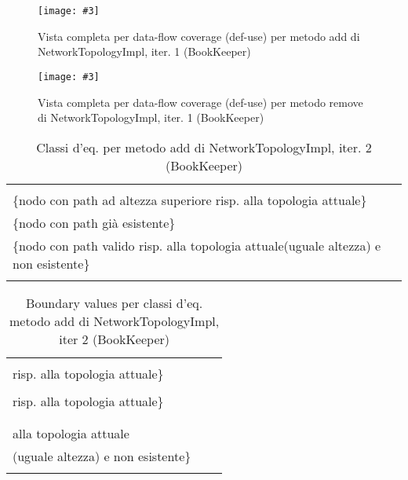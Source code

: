 \documentclass[10pt, a4paper]{article}
\newcommand{\Intmaketable}[4]{
	\begin{longtable}{#3}
	#4
	\caption{#2}
	\label{#1}
	\end{longtable}
}
\newcommand{\Intceqtable}[3]{
	\Intmaketable{#1}{#2}{|l|l|}{
	\hline
	\thead{Parametro formale} & \thead{Classi d'equivalenza} \\
	\hline
	\hline
	#3
	\hline}
}
\newcommand{\Intbvtable}[3]{
	\Intmaketable{#1}{#2}{|l|l|l|}{
	\hline
	\thead{Parametro formale} & \thead{Classe d'equivalenza} & \thead{Boundary value}\\
	\hline
	\hline
	#3
	\hline}
}
\newcommand{\Intceqcaption}[4]{Classi d'eq. per metodo #1 di #2, iter. #3 (#4)}
\newcommand{\Intbvcaption}[4]{Boundary values per classi d'eq. metodo #1 di #2, iter #3 (#4)}
\newcommand{\gettablelabel}[5]{table:#1:#2:#3:iter#4:proj#5}
\newcommand{\ceqtable}[5]{
	\Intceqtable{\gettablelabel{ceq}{#1}{#2}{#3}{#4}}
		{\Intceqcaption{#1}{#2}{#3}{#4}}
		{#5}
}
\newcommand{\bvtable}[5]{
	\Intbvtable{\gettablelabel{bv}{#1}{#2}{#3}{#4}}
		{\Intbvcaption{#1}{#2}{#3}{#4}}
		{#5}
}
\newcommand{\getpicturelabel}[1]{picture:#1}
\newcommand{\makepicture}[4]{
	\begin{figure}[H]
	\centering
	\texttt{[image: \#3]}
	\caption{#4}
	\label{\getpicturelabel{#3}}
	\end{figure}
}
\newcommand{\alldfcovcaption}[4]{Vista completa per data-flow coverage (def-use) per metodo #1 di #2, iter. #3 (#4)}
\newcommand{\tcell}{\makecell[tl]}
\newcommand{\newtrow}{\\ \hline}
\def\bookkeeper{BookKeeper}
\newcommand{\ceq}[1]{\{#1\}}
\begin{document}
	\makepicture{13cm}{23cm}{bk/dataflow-add-NetworkTopologyImpl-1}
				{\alldfcovcaption{add}{NetworkTopologyImpl}{1}{\bookkeeper}}
				
	\makepicture{13cm}{15cm}{bk/dataflow-remove-NetworkTopologyImpl-1}
				{\alldfcovcaption{remove}{NetworkTopologyImpl}{1}{\bookkeeper}}

	
	\ceqtable{add}{NetworkTopologyImpl}{2}{\bookkeeper}{
			\tcell{node} & \tcell{
									\ceq{nodo con path ad altezza inferiore risp. alla topologia attuale} \\
									\ceq{nodo con path ad altezza superiore risp. alla topologia attuale} \\
									\ceq{nodo con path già esistente} \\
									\ceq{nodo con path valido risp. alla topologia attuale(uguale altezza) e non esistente}
								}
		\newtrow
	}
	
	\bvtable{add}{NetworkTopologyImpl}{2}{\bookkeeper}{
			\tcell{node} & 
			\tcell{\ceq{nodo con path ad altezza inferiore\\ risp. alla topologia attuale}} &
			\tcell{Node("/rack-1/bookie-1")}
		\newtrow
			\tcell{node} &
			\tcell{\ceq{nodo con path ad altezza superiore\\ risp. alla topologia attuale}} &
			\tcell{Node("/region-1/dc-1/rack-1/bookie-1")}
		\newtrow
			\tcell{node} &
			\tcell{\ceq{nodo con path già esistente}} &
			\tcell{Node("/dc-1/rack-1/bookie-1")}
		\newtrow
			\tcell{node} &
			\tcell{\ceq{nodo con path valido risp.\\ alla topologia attuale\\(uguale altezza) e non esistente}} &
			\tcell{Node("/dc-3/rack-4/bookie-7")}
		\newtrow
	}
	
\end{document}
